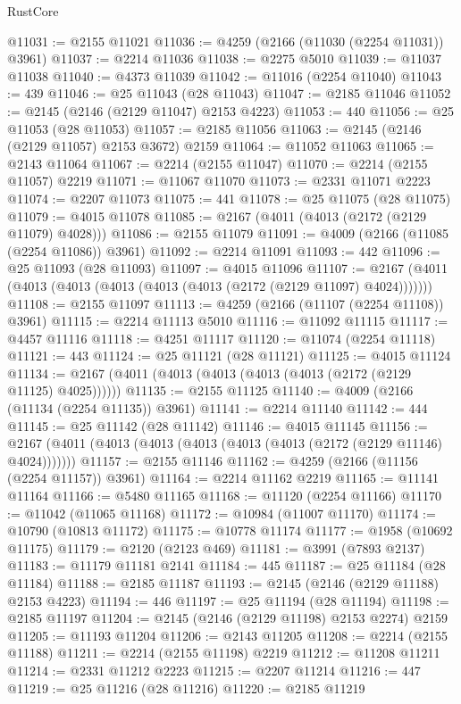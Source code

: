 \begin{lexlean}{RustCore}
\begin{coremodule}
@11031 := @2155 @11021
@11036 := @4259 (@2166 (@11030 (@2254 @11031)) @3961)
@11037 := @2214 @11036
@11038 := @2275 @5010
@11039 := @11037 @11038
@11040 := @4373 @11039
@11042 := @11016 (@2254 @11040)
@11043 := 439
@11046 := @25 @11043 (@28 @11043)
@11047 := @2185 @11046
@11052 := @2145 (@2146 (@2129 @11047) @2153 @4223)
@11053 := 440
@11056 := @25 @11053 (@28 @11053)
@11057 := @2185 @11056
@11063 := @2145 (@2146 (@2129 @11057) @2153 @3672) @2159
@11064 := @11052 @11063
@11065 := @2143 @11064
@11067 := @2214 (@2155 @11047)
@11070 := @2214 (@2155 @11057) @2219
@11071 := @11067 @11070
@11073 := @2331 @11071 @2223
@11074 := @2207 @11073
@11075 := 441
@11078 := @25 @11075 (@28 @11075)
@11079 := @4015 @11078
@11085 := @2167 (@4011 (@4013 (@2172 (@2129 @11079) @4028)))
@11086 := @2155 @11079
@11091 := @4009 (@2166 (@11085 (@2254 @11086)) @3961)
@11092 := @2214 @11091
@11093 := 442
@11096 := @25 @11093 (@28 @11093)
@11097 := @4015 @11096
@11107 := @2167 (@4011 (@4013 (@4013 (@4013 (@4013 (@4013 (@2172 (@2129 @11097) @4024)))))))
@11108 := @2155 @11097
@11113 := @4259 (@2166 (@11107 (@2254 @11108)) @3961)
@11115 := @2214 @11113 @5010
@11116 := @11092 @11115
@11117 := @4457 @11116
@11118 := @4251 @11117
@11120 := @11074 (@2254 @11118)
@11121 := 443
@11124 := @25 @11121 (@28 @11121)
@11125 := @4015 @11124
@11134 := @2167 (@4011 (@4013 (@4013 (@4013 (@4013 (@2172 (@2129 @11125) @4025))))))
@11135 := @2155 @11125
@11140 := @4009 (@2166 (@11134 (@2254 @11135)) @3961)
@11141 := @2214 @11140
@11142 := 444
@11145 := @25 @11142 (@28 @11142)
@11146 := @4015 @11145
@11156 := @2167 (@4011 (@4013 (@4013 (@4013 (@4013 (@4013 (@2172 (@2129 @11146) @4024)))))))
@11157 := @2155 @11146
@11162 := @4259 (@2166 (@11156 (@2254 @11157)) @3961)
@11164 := @2214 @11162 @2219
@11165 := @11141 @11164
@11166 := @5480 @11165
@11168 := @11120 (@2254 @11166)
@11170 := @11042 (@11065 @11168)
@11172 := @10984 (@11007 @11170)
@11174 := @10790 (@10813 @11172)
@11175 := @10778 @11174
@11177 := @1958 (@10692 @11175)
@11179 := @2120 (@2123 @469)
@11181 := @3991 (@7893 @2137)
@11183 := @11179 @11181 @2141
@11184 := 445
@11187 := @25 @11184 (@28 @11184)
@11188 := @2185 @11187
@11193 := @2145 (@2146 (@2129 @11188) @2153 @4223)
@11194 := 446
@11197 := @25 @11194 (@28 @11194)
@11198 := @2185 @11197
@11204 := @2145 (@2146 (@2129 @11198) @2153 @2274) @2159
@11205 := @11193 @11204
@11206 := @2143 @11205
@11208 := @2214 (@2155 @11188)
@11211 := @2214 (@2155 @11198) @2219
@11212 := @11208 @11211
@11214 := @2331 @11212 @2223
@11215 := @2207 @11214
@11216 := 447
@11219 := @25 @11216 (@28 @11216)
@11220 := @2185 @11219

\end{coremodule}
\end{lexlean}
